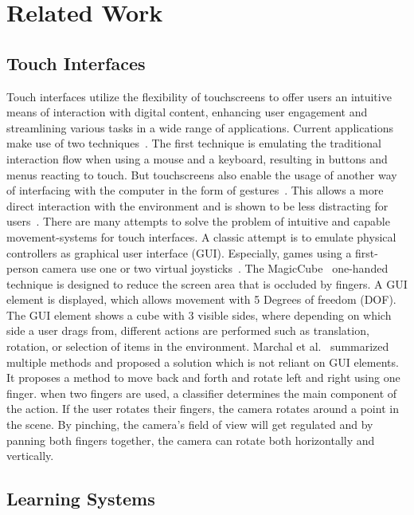 \section{Related Work}
\subsection{Touch Interfaces}
Touch interfaces utilize the flexibility of touchscreens to offer users an intuitive means of interaction with digital content, enhancing user engagement and streamlining various tasks in a wide range of applications. Current applications make use of two techniques~\cite{menuTouch, menuTouch2, touchReview}. The first technique is emulating the traditional interaction flow when using a mouse and a keyboard, resulting in buttons and menus reacting to touch. But touchscreens also enable the usage of another way of interfacing with the computer in the form of gestures~\cite{gesturalInterfaces}. This allows a more direct interaction with the environment and is shown to be less distracting for users~\cite{menuTouch2}.
%
There are many attempts to solve the problem of intuitive and capable movement-systems for touch interfaces. A classic attempt is to emulate physical controllers as graphical user interface (GUI). Especially, games using a first-person camera use one or two virtual joysticks~\cite{multiTouch3D}.  
%
The MagicCube~\cite{magicCube} one-handed technique is designed to reduce the screen area that is occluded by fingers. A GUI element is displayed, which allows movement with 5 Degrees of freedom (DOF). The GUI element shows a cube with 3 visible sides, where depending on which side a user drags from, different actions are performed such as translation, rotation, or selection of items in the environment.
%
Marchal et al.~\cite{multiTouch3D} summarized multiple methods and proposed a solution which is not reliant on GUI elements. It proposes a method to move back and forth and rotate left and right using one finger. when two fingers are used, a classifier determines the main component of the action. If the user rotates their fingers, the camera rotates around a point in the scene. By pinching, the camera's field of view will get regulated and by panning both fingers together, the camera can rotate both horizontally and vertically.


\subsection{Learning Systems}

